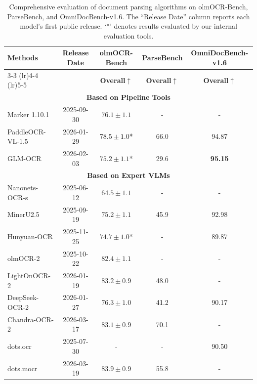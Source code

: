 \begin{table}[htbp]
\centering
\caption{Comprehensive evaluation of document parsing algorithms on olmOCR-Bench, ParseBench, and OmniDocBench-v1.6. The ``Release Date'' column reports each model's first public release. `*' denotes results evaluated by our internal evaluation tools.}
\label{tab:document_parsing_public}
\small
\begin{tabular}{l c c c c}
\toprule
\multirow{2}{*}{\textbf{Methods}} & \multirow{2}{*}{\textbf{Release Date}} & \textbf{olmOCR-Bench} & \textbf{ParseBench} & \textbf{OmniDocBench-v1.6} \\
\cmidrule(lr){3-3} \cmidrule(lr){4-4} \cmidrule(lr){5-5}
& & \textbf{Overall$\uparrow$} & \textbf{Overall$\uparrow$} & \textbf{Overall$\uparrow$} \\
\midrule

\multicolumn{5}{c}{\textbf{Based on Pipeline Tools}} \\
\midrule
Marker 1.10.1 & 2025-09-30 & $76.1 \pm 1.1$ & - & - \\
PaddleOCR-VL-1.5 & 2026-01-29 & $78.5 \pm 1.0$* & 66.0 & 94.87 \\
GLM-OCR & 2026-02-03 & $75.2 \pm 1.1$* & 29.6 & \textbf{95.15} \\
\midrule

\multicolumn{5}{c}{\textbf{Based on Expert VLMs}} \\
\midrule
Nanonets-OCR-s & 2025-06-12 & $64.5 \pm 1.1$ & - & - \\
MinerU2.5 & 2025-09-19 & $75.2 \pm 1.1$ & 45.9 & 92.98 \\
Hunyuan-OCR & 2025-11-25 & $74.7 \pm 1.0$* & - & 89.87 \\
olmOCR-2 & 2025-10-22 & $82.4 \pm 1.1$ & - & - \\
LightOnOCR-2 & 2026-01-19 & $83.2 \pm 0.9$ & 48.0 & - \\
DeepSeek-OCR-2 & 2026-01-27 & $76.3 \pm 1.0$ & 41.2 & 90.17 \\
Chandra-OCR-2 & 2026-03-17 & $83.1 \pm 0.9$ & 70.1 & - \\
dots.ocr & 2025-07-30 & - & - & 90.50 \\
dots.mocr & 2026-03-19 & $83.9 \pm 0.9$ & 55.8 & - \\
\midrule


\end{tabular}
\end{table}
